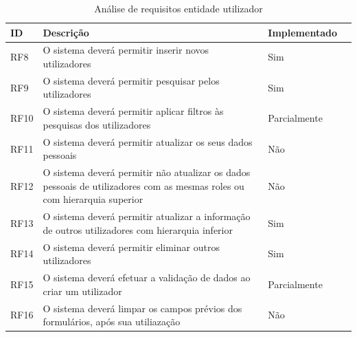 \documentclass[a4paper,12pt]{article} %
\begin{document}
\begin{table}[H]
	\centering
	\begin{tabular}{|l|p{12cm}|l|r|}
		\hline
		\textbf{ID} & \textbf{Descrição} & \textbf{Implementado}\\
		\hline
		RF8 & O sistema deverá permitir inserir novos utilizadores & Sim \\
		\hline
		RF9 & O sistema deverá permitir pesquisar pelos utilizadores & Sim \\
		\hline
		RF10 & O sistema deverá permitir aplicar filtros às pesquisas dos utilizadores & Parcialmente\footnotemark[2] \\
		\hline
		RF11 & O sistema deverá permitir atualizar os seus dados pessoais & Não \\
		\hline
		RF12 & O sistema deverá permitir não atualizar os dados pessoais de utilizadores com as mesmas roles ou com hierarquia superior & Não \\
		\hline
		RF13 & O sistema deverá permitir atualizar a informação de outros utilizadores com hierarquia inferior & Sim \\
		\hline
		RF14 & O sistema deverá permitir eliminar outros utilizadores & Sim \\
		\hline
		RF15 & O sistema deverá efetuar a validação de dados ao criar um utilizador & Parcialmente\footnotemark[3] \\
		\hline
		RF16 & O sistema deverá limpar os campos prévios dos formulários, após sua utiliazação & Não \\
		\hline
	\end{tabular}
	\caption{Análise de requisitos entidade utilizador}
\end{table}

\end{document}
